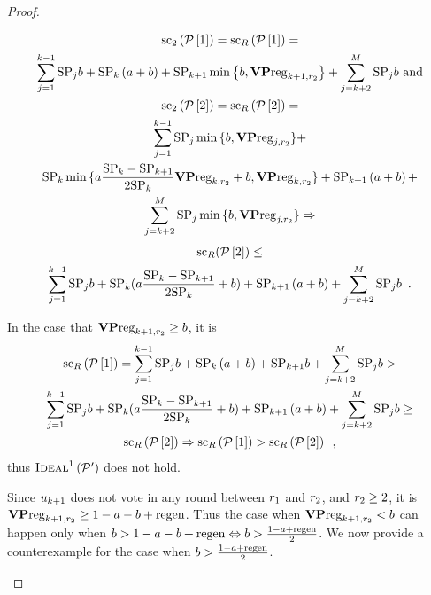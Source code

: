 \begin{proof}
\begin{itemize}
    \begin{gather*}
      \mathrm{sc}_2\left(\mathcal{P}\left[1\right]\right) =
      \mathrm{sc}_R\left(\mathcal{P}\left[1\right]\right) = \\
      \sum\limits_{j = 1}^{k-1}\mathrm{SP}_j b + \mathrm{SP}_k \left(a + b\right) +
      \mathrm{SP}_{k+1} \min{\left\{b, \mathrm{\textbf{VP}reg}_{k+1,r_2}\right\}} +
      \sum\limits_{j = k + 2}^{M}\mathrm{SP}_j b \text{ and} \\
      \mathrm{sc}_2\left(\mathcal{P}\left[2\right]\right) =
      \mathrm{sc}_R\left(\mathcal{P}\left[2\right]\right) = \\
      \sum\limits_{j = 1}^{k-1}\mathrm{SP}_j \min{\{b, \mathrm{\textbf{VP}reg}_{j,r_2}\}} + \\
      \mathrm{SP}_k \min{\{a \frac{\mathrm{SP}_k - \mathrm{SP}_{k+1}}{2\mathrm{SP}_k}
      \mathrm{\textbf{VP}reg}_{k, r_2} + b, \mathrm{\textbf{VP}reg}_{k, r_2}\}} + \mathrm{SP}_{k+1}
      \left(a + b\right) + \\
      \sum\limits_{j = k + 2}^{M}\mathrm{SP}_j \min{\{b, \mathrm{\textbf{VP}reg}_{j,
      r_2}\}} \Rightarrow
    \end{gather*}
    \begin{gather*}
      \mathrm{sc}_R(\mathcal{P}\left[2\right]) \leq \\
      \sum\limits_{j = 1}^{k-1}\mathrm{SP}_j b + \mathrm{SP}_k (a \frac{\mathrm{SP}_k -
      \mathrm{SP}_{k+1}}{2\mathrm{SP}_k} + b) + \mathrm{SP}_{k+1} \left(a + b\right) +
      \sum\limits_{j = k + 2}^{M}\mathrm{SP}_j b \enspace.
    \end{gather*}

    In the case that $\mathrm{\textbf{VP}reg}_{k+1, r_2} \geq b$, it is
    \begin{gather*}
      \mathrm{sc}_R\left(\mathcal{P}\left[1\right]\right) = \sum\limits_{j =
      1}^{k-1}\mathrm{SP}_j b + \mathrm{SP}_k \left(a + b\right) + \mathrm{SP}_{k+1} b +
      \sum\limits_{j = k + 2}^{M}\mathrm{SP}_j b > \\
      \sum\limits_{j = 1}^{k-1}\mathrm{SP}_j b + \mathrm{SP}_k (a \frac{\mathrm{SP}_k -
      \mathrm{SP}_{k+1}}{2\mathrm{SP}_k} + b) + \mathrm{SP}_{k+1} \left(a + b\right) +
      \sum\limits_{j = k + 2}^{M}\mathrm{SP}_j b \geq \\
      \mathrm{sc}_R\left(\mathcal{P}\left[2\right]\right) \Rightarrow
      \mathrm{sc}_R\left(\mathcal{P}\left[1\right]\right) >
      \mathrm{sc}_R\left(\mathcal{P}\left[2\right]\right) \enspace,
    \end{gather*}
    thus $\textsc{Ideal}^1\left(\mathcal{P}'\right)$ does not hold.

    Since $u_{k+1}$ does not vote in any round between $r_1$ and
    $r_2$, and $r_2 \geq 2$, it is $\mathrm{\textbf{VP}reg}_{k+1, r_2} \geq 1 -
    a - b + \mathrm{regen}$. Thus the case when $\mathrm{\textbf{VP}reg}_{k+1, r_2} < b$ can
    happen only when $b > 1 - a - b + \mathrm{regen} \Leftrightarrow b > \frac{1 - a +
    \mathrm{regen}}{2}$. We now provide a counterexample for the case when $b > \frac{1
    - a + \mathrm{regen}}{2}$.


\end{itemize}
\end{proof}
